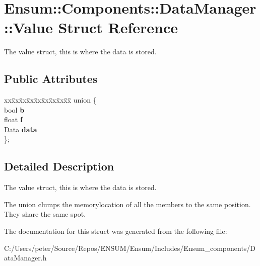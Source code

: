 \hypertarget{struct_ensum_1_1_components_1_1_data_manager_1_1_value}{}\section{Ensum\+:\+:Components\+:\+:Data\+Manager\+:\+:Value Struct Reference}
\label{struct_ensum_1_1_components_1_1_data_manager_1_1_value}


The value struct, this is where the data is stored.  


\subsection*{Public Attributes}
\begin{DoxyCompactItemize}
\item 
\begin{tabbing}
xx\=xx\=xx\=xx\=xx\=xx\=xx\=xx\=xx\=\kill
union \{\\
\>bool {\bfseries b}\\
\>float {\bfseries f}\\
\>\hyperlink{struct_ensum_1_1_components_1_1_data_manager_1_1_data}{Data} {\bfseries data}\\
\}; \hypertarget{struct_ensum_1_1_components_1_1_data_manager_1_1_value_a2574075dccef0806011258ddbe984e36}{}\label{struct_ensum_1_1_components_1_1_data_manager_1_1_value_a2574075dccef0806011258ddbe984e36}
\\

\end{tabbing}\end{DoxyCompactItemize}


\subsection{Detailed Description}
The value struct, this is where the data is stored. 

The union clumps the memorylocation of all the members to the same position. They share the same spot. 

The documentation for this struct was generated from the following file\+:\begin{DoxyCompactItemize}
\item 
C\+:/\+Users/peter/\+Source/\+Repos/\+E\+N\+S\+U\+M/\+Ensum/\+Includes/\+Ensum\+\_\+components/Data\+Manager.\+h\end{DoxyCompactItemize}
